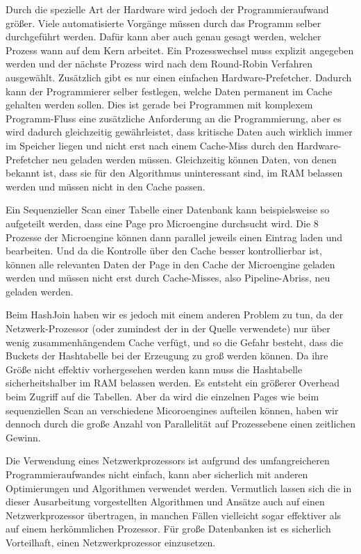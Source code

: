 Durch die spezielle Art der Hardware wird jedoch der Programmieraufwand größer. Viele automatisierte Vorgänge müssen durch das Programm selber durchgeführt werden. Dafür kann aber auch genau gesagt werden, welcher Prozess wann auf dem Kern arbeitet. Ein Prozesswechsel muss explizit angegeben werden und der nächste Prozess wird nach dem Round-Robin Verfahren ausgewählt. Zusätzlich gibt es nur einen einfachen Hardware-Prefetcher. Dadurch kann der Programmierer selber festlegen, welche Daten permanent im Cache gehalten werden sollen. Dies ist gerade bei Programmen mit komplexem Programm-Fluss eine zusätzliche Anforderung an die Programmierung, aber es wird dadurch gleichzeitig gewährleistet, dass kritische Daten auch wirklich immer im Speicher liegen und nicht erst nach einem Cache-Miss durch den Hardware-Prefetcher neu geladen werden müssen. Gleichzeitig können Daten, von denen bekannt ist, dass sie für den Algorithmus uninteressant sind, im RAM belassen werden und müssen nicht in den Cache passen.

Ein Sequenzieller Scan einer Tabelle einer Datenbank kann beispielsweise so aufgeteilt werden, dass eine Page pro Microengine durchsucht wird. Die 8 Prozesse der Microengine können dann parallel jeweils einen Eintrag laden und bearbeiten. Und da die Kontrolle über den Cache besser kontrollierbar ist, können alle relevanten Daten der Page in den Cache der Microengine geladen werden und müssen nicht erst durch Cache-Misses, also Pipeline-Abriss, neu geladen werden.

Beim HashJoin haben wir es jedoch mit einem anderen Problem zu tun, da der Netzwerk-Prozessor  (oder zumindest der in der Quelle verwendete) nur über wenig zusammenhängendem Cache verfügt, und so die Gefahr besteht, dass die Buckets der Hashtabelle bei der Erzeugung zu groß werden können. Da ihre Größe nicht effektiv vorhergesehen werden kann muss die Hashtabelle sicherheitshalber im RAM belassen werden. Es entsteht ein größerer Overhead beim Zugriff auf die Tabellen. Aber da wird die einzelnen Pages wie beim sequenziellen Scan an verschiedene Micoroengines aufteilen können, haben wir dennoch durch die große Anzahl von Parallelität auf Prozessebene einen zeitlichen Gewinn.

Die Verwendung eines Netzwerkprozessors ist aufgrund des umfangreicheren Programmieraufwandes nicht einfach, kann aber sicherlich mit anderen Optimierungen und Algorithmen verwendet werden. Vermutlich lassen sich die in dieser Ausarbeitung vorgestellten Algorithmen und Ansätze auch auf einen Netzwerkprozessor übertragen, in manchen Fällen vielleicht sogar effektiver als auf einem herkömmlichen Prozessor. Für große Datenbanken ist es sicherlich Vorteilhaft, einen Netzwerkprozessor einzusetzen.


